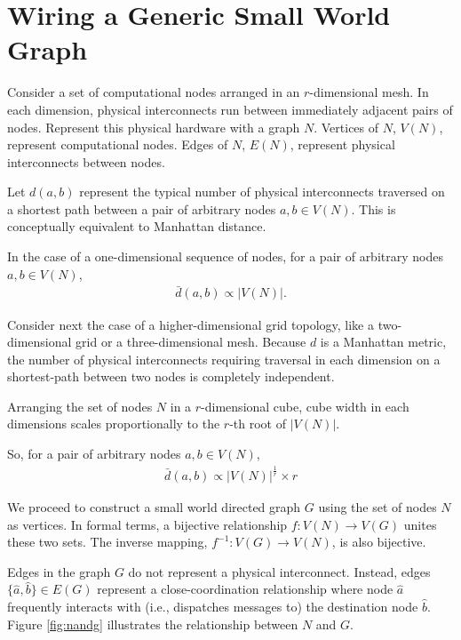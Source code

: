 \section{Wiring a Generic Small World Graph} \label{sec:proof1}

Consider a set of computational nodes arranged in an $r$-dimensional mesh.
In each dimension, physical interconnects run between immediately adjacent pairs of nodes.
Represent this physical hardware with a graph $N$.
Vertices of $N$, $V(N)$, represent computational nodes.
Edges of $N$, $E(N)$, represent physical interconnects between nodes.

Let $d(a,b)$ represent the typical number of physical interconnects traversed on a shortest path between a pair of arbitrary nodes $a, b \in V(N)$.
This is conceptually equivalent to Manhattan distance.

In the case of a one-dimensional sequence of nodes, for a pair of arbitrary nodes $a,b \in V(N)$,
\begin{align*}
\bar{d}(a,b) \propto |V(N)|.
\end{align*}

Consider next the case of a higher-dimensional grid topology, like a two-dimensional grid or a three-dimensional mesh.
Because $d$ is a Manhattan metric, the number of physical interconnects requiring traversal in each dimension on a shortest-path between two nodes is completely independent.

Arranging the set of nodes $N$ in a $r$-dimensional cube, cube width in each dimensions scales proportionally to the $r$-th root of $|V(N)|$.

So, for a pair of arbitrary nodes $a,b \in V(N)$,
\begin{align} \label{eqn:mesh_prop}
\bar{d}(a, b) \propto |V(N)|^{\frac{1}{r}} \times r
\end{align}

We proceed to construct a small world directed graph $G$ using the set of nodes $N$ as vertices.
In formal terms, a bijective relationship $f: V(N) \rightarrow V(G)$ unites these two sets.
The inverse mapping, $f^{-1}: V(G) \rightarrow V(N)$, is also bijective.

Edges in the graph $G$ do not represent a physical interconnect.
Instead, edges $\{\hat{a}, \hat{b}\} \in E(G)$ represent a close-coordination relationship where node $\hat{a}$ frequently interacts with (i.e., dispatches messages to) the destination node $\hat{b}$.
Figure \ref{fig:nandg} illustrates the relationship between $N$ and $G$.

